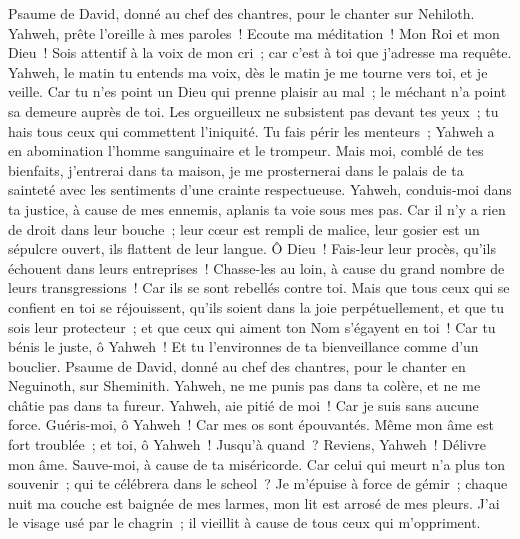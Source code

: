 \begin{multicols}{2}
\VerseOne{}Psaume de David, donné au chef des chantres, pour le chanter sur Nehiloth.
Yahweh, prête l'oreille à mes paroles~! Ecoute ma méditation~!
Mon Roi et mon Dieu~! Sois attentif à la voix de mon cri~; car c'est à toi que j'adresse ma requête.
Yahweh, le matin tu entends ma voix, dès le matin je me tourne vers toi, et je veille.
Car tu n'es point un Dieu qui prenne plaisir au mal~; le méchant n'a point sa demeure auprès de toi.
Les orgueilleux ne subsistent pas devant tes yeux~; tu hais tous ceux qui commettent l'iniquité.
Tu fais périr les menteurs~; Yahweh a en abomination l'homme sanguinaire et le trompeur.
Mais moi, comblé de tes bienfaits, j'entrerai dans ta maison, je me prosternerai dans le palais de ta sainteté avec les sentiments d'une crainte respectueuse.
Yahweh, conduis-moi dans ta justice, à cause de mes ennemis, aplanis ta voie sous mes pas.
Car il n'y a rien de droit dans leur bouche~; leur cœur est rempli de malice, leur gosier est un sépulcre ouvert, ils flattent de leur langue.
Ô Dieu~! Fais-leur leur procès, qu'ils échouent dans leurs entreprises~! Chasse-les au loin, à cause du grand nombre de leurs transgressions~! Car ils se sont rebellés contre toi.
Mais que tous ceux qui se confient en toi se réjouissent, qu'ils soient dans la joie perpétuellement, et que tu sois leur protecteur~; et que ceux qui aiment ton Nom s'égayent en toi~!
Car tu bénis le juste, ô Yahweh~! Et tu l'environnes de ta bienveillance comme d'un bouclier.
\VerseOne{}Psaume de David, donné au chef des chantres, pour le chanter en Neguinoth, sur Sheminith.
Yahweh, ne me punis pas dans ta colère, et ne me châtie pas dans ta fureur.
Yahweh, aie pitié de moi~! Car je suis sans aucune force. Guéris-moi, ô Yahweh~! Car mes os sont épouvantés.
Même mon âme est fort troublée~; et toi, ô Yahweh~! Jusqu'à quand~?
Reviens, Yahweh~! Délivre mon âme. Sauve-moi, à cause de ta miséricorde.
Car celui qui meurt n'a plus ton souvenir~; qui te célébrera dans le scheol~?
Je m'épuise à force de gémir~; chaque nuit ma couche est baignée de mes larmes, mon lit est arrosé de mes pleurs.
J'ai le visage usé par le chagrin~; il vieillit à cause de tous ceux qui m'oppriment.

\end{multicols}
